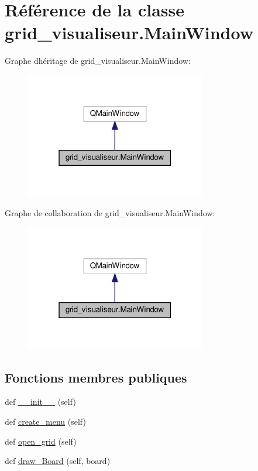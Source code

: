 \hypertarget{classgrid__visualiseur_1_1MainWindow}{}\section{Référence de la classe grid\+\_\+visualiseur.\+Main\+Window}
\label{classgrid__visualiseur_1_1MainWindow}


Graphe d\textquotesingle{}héritage de grid\+\_\+visualiseur.\+Main\+Window\+:\nopagebreak
\begin{figure}[H]
\begin{center}
\leavevmode
\includegraphics[width=223pt]{classgrid__visualiseur_1_1MainWindow__inherit__graph}
\end{center}
\end{figure}


Graphe de collaboration de grid\+\_\+visualiseur.\+Main\+Window\+:\nopagebreak
\begin{figure}[H]
\begin{center}
\leavevmode
\includegraphics[width=223pt]{classgrid__visualiseur_1_1MainWindow__coll__graph}
\end{center}
\end{figure}
\subsection*{Fonctions membres publiques}
\begin{DoxyCompactItemize}
\item 
def \hyperlink{classgrid__visualiseur_1_1MainWindow_aa58b1a902fbbe5e3ceda337c7ef87658}{\+\_\+\+\_\+init\+\_\+\+\_\+} (self)
\item 
def \hyperlink{classgrid__visualiseur_1_1MainWindow_a4c84e902c352f90578745c1d5112e373}{create\+\_\+menu} (self)
\item 
def \hyperlink{classgrid__visualiseur_1_1MainWindow_a6d4f89a1640755a326a358026815ca66}{open\+\_\+grid} (self)
\item 
def \hyperlink{classgrid__visualiseur_1_1MainWindow_a4915c6cc9059cb6949bc8d1e997e1af1}{draw\+\_\+\+Board} (self, board)
\end{DoxyCompactItemize}
